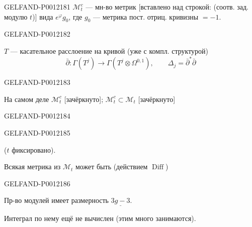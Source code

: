 \begin{GelfandAdjacentEvidence}{GELFAND-P001218}{1}
\(\mathcal M_t^c\) --- мн-во метрик [вставлено над строкой: (соотв. зад. модулю \(t\))] вида \(e^\varphi g_0\),
где \(g_0\) --- метрика пост. отриц. кривизны \(=-1\).
\end{GelfandAdjacentEvidence}
\begin{GelfandAdjacentEvidence}{GELFAND-P001218}{2}


\(T\) --- касательное расслоение на кривой (уже с компл. структурой)
\[
\bar\partial:\Gamma(T^j)\longrightarrow\Gamma(T^j\otimes\Omega^{0,1}),
\qquad\Delta_j=\bar\partial^*\bar\partial
\]
\end{GelfandAdjacentEvidence}
\begin{GelfandAdjacentEvidence}{GELFAND-P001218}{3}


На самом деле \(\mathcal M_t^c\) [зачёркнуто]; \(\mathcal M_t^c\subset\mathcal M_t\)
[зачёркнуто]
\end{GelfandAdjacentEvidence}
\begin{GelfandAdjacentEvidence}{GELFAND-P001218}{4}

\end{GelfandAdjacentEvidence}
\begin{GelfandAdjacentEvidence}{GELFAND-P001218}{5}


(\(t\) фиксировано).

Всякая метрика из \(\mathcal M_t\) может быть (действием \(\operatorname{Diff}\))
\end{GelfandAdjacentEvidence}
\begin{GelfandAdjacentEvidence}{GELFAND-P001218}{6}


Пр-во модулей имеет размерность \(\underline{3g-3}\).

Интеграл по нему ещё не вычислен (этим много занимаются).

\end{GelfandAdjacentEvidence}
